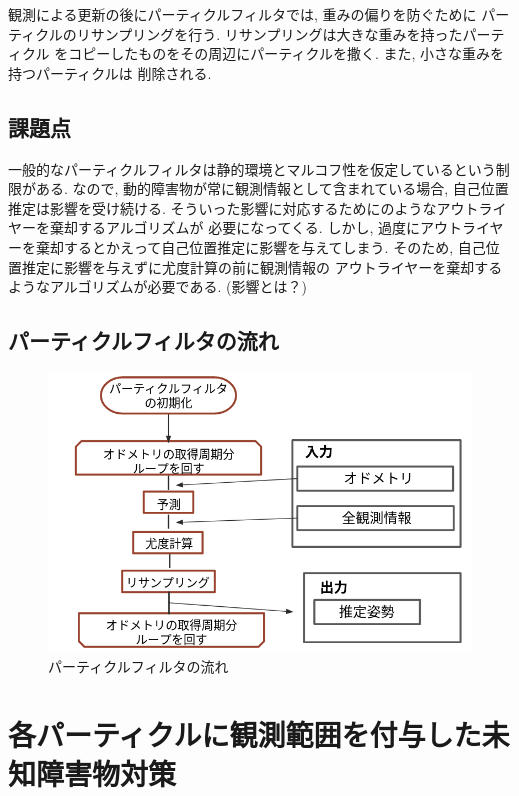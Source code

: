 観測による更新の後にパーティクルフィルタでは, 重みの偏りを防ぐために
パーティクルのリサンプリングを行う. リサンプリングは大きな重みを持ったパーティクル
をコピーしたものをその周辺にパーティクルを撒く. また, 小さな重みを持つパーティクルは
削除される. 

\section{課題点}

一般的なパーティクルフィルタは静的環境とマルコフ性を仮定しているという制限がある. 
なので, 動的障害物が常に観測情報として含まれている場合, 自己位置推定は影響を受け続ける. 
そういった影響に対応するために\cite{赤井}のようなアウトライヤーを棄却するアルゴリズムが
必要になってくる. 
しかし, 過度にアウトライヤーを棄却するとかえって自己位置推定に影響を与えてしまう. 
そのため, 自己位置推定に影響を与えずに尤度計算の前に観測情報の
アウトライヤーを棄却するようなアルゴリズムが必要である. (影響とは？)

\newpage
\section{パーティクルフィルタの流れ}
\begin{figure}[h]
  \begin{center}
    \includegraphics[width=1.2\linewidth]{figs/particle_filter_flow.png}
    \caption{パーティクルフィルタの流れ}
    \label{fig:particle_filter_flow}
  \end{center}
\end{figure}

\chapter{各パーティクルに観測範囲を付与した未知障害物対策}
